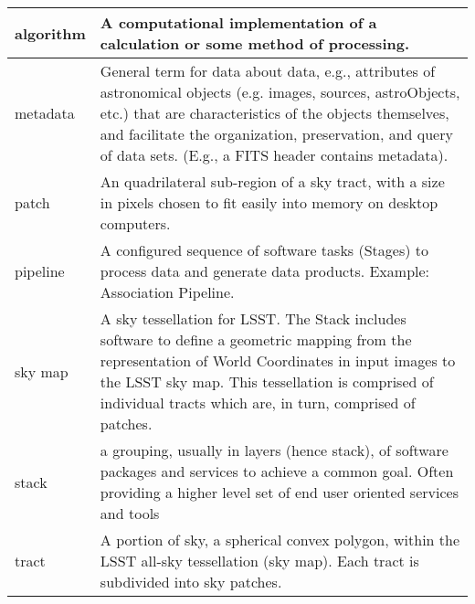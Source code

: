 \begin{longtable}{|l|p{}|}
algorithm & A computational implementation of a calculation or some method of processing. \\\hline
metadata & General term for data about data, e.g., attributes of astronomical objects (e.g. images, sources, astroObjects, etc.) that are characteristics of the objects themselves, and facilitate the organization, preservation, and query of data sets. (E.g., a \gls{FITS} header contains \gls{metadata}). \\\hline
patch & An quadrilateral sub-region of a sky \gls{tract}, with a size in pixels chosen to fit easily into memory on desktop computers. \\\hline
pipeline & A configured sequence of software tasks (Stages) to process data and generate data products. Example: \gls{Association Pipeline}. \\\hline
sky map & A sky tessellation for \gls{LSST}. The Stack includes software to define a geometric mapping from the representation of World Coordinates in input images to the \gls{LSST} \gls{sky map}. This tessellation is comprised of individual tracts which are, in turn, comprised of patches. \\\hline
stack & a grouping, usually in layers (hence \gls{stack}), of software packages and services to achieve a common goal. Often providing a higher level set of end user oriented services and tools \\\hline
tract & A portion of sky, a spherical convex polygon, within the \gls{LSST} all-sky tessellation (\gls{sky map}). Each \gls{tract} is subdivided into sky patches. \\\hline
\end{longtable}
